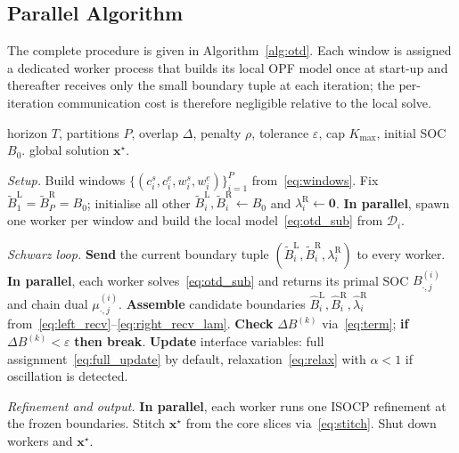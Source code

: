 \subsection{Parallel Algorithm}
\label{sec:otd_algo}

The complete procedure is given in Algorithm~\ref{alg:otd}. Each window is
assigned a dedicated worker process that builds its local OPF model once
at start-up and thereafter receives only the small boundary tuple at
each iteration; the per-iteration communication cost is therefore
negligible relative to the local solve.

\begin{algorithm}[t]
\caption{Parallel OTD--Schwarz}
\label{alg:otd}
\begin{algorithmic}[1]
\Require horizon $T$, partitions $P$, overlap $\Delta$, penalty $\rho$,
         tolerance $\varepsilon$, cap $K_{\max}$, initial SOC $B_{0}$.
\Ensure global solution $\bm{x}^{\star}$.

\vspace{2pt}\Statex \textit{Setup.}
\State Build windows $\{(c^{s}_{i},c^{e}_{i},w^{s}_{i},w^{e}_{i})\}_{i=1}^{P}$
       from~\eqref{eq:windows}.
\State Fix $\widetilde{B}^{\mathrm{L}}_{1}\!=\!\widetilde{B}^{\mathrm{R}}_{P}\!=\!B_{0}$;
       initialise all other $\widetilde{B}^{\mathrm{L}}_{i},
       \widetilde{B}^{\mathrm{R}}_{i}\!\leftarrow\!B_{0}$ and
       $\lambda^{\mathrm{R}}_{i}\!\leftarrow\!\bm{0}$.
\State \textbf{In parallel}, spawn one worker per window and build the local
       model~\eqref{eq:otd_sub} from $\mathcal{D}_{i}$.

\vspace{2pt}\Statex \textit{Schwarz loop.}
  \State \textbf{Send} the current boundary tuple
         $(\widetilde{B}^{\mathrm{L}}_{i},\widetilde{B}^{\mathrm{R}}_{i},
         \lambda^{\mathrm{R}}_{i})$ to every worker.
  \State \textbf{In parallel}, each worker solves~\eqref{eq:otd_sub}
         and returns its primal SOC $B^{(i)}_{\cdot,j}$ and chain dual
         $\mu^{(i)}_{\cdot,j}$.
  \State \textbf{Assemble} candidate boundaries
         $\widehat{B}^{\mathrm{L}}_{i},\widehat{B}^{\mathrm{R}}_{i},
         \widehat{\lambda}^{\mathrm{R}}_{i}$
         from~\eqref{eq:left_recv}--\eqref{eq:right_recv_lam}.
  \State \textbf{Check} $\Delta B^{(k)}$ via~\eqref{eq:term};\;
         \textbf{if} $\Delta B^{(k)}<\varepsilon$ \textbf{then break}.
  \State \textbf{Update} interface variables: full
         assignment~\eqref{eq:full_update} by default,\;
         relaxation~\eqref{eq:relax} with $\alpha\!<\!1$ if oscillation
         is detected.
\EndFor

\vspace{2pt}\Statex \textit{Refinement and output.}
  \State \textbf{In parallel}, each worker runs one ISOCP refinement at
         the frozen boundaries.
\EndIf
\State Stitch $\bm{x}^{\star}$ from the core slices via~\eqref{eq:stitch}.
\State Shut down workers and \Return $\bm{x}^{\star}$.
\end{algorithmic}
\end{algorithm}


